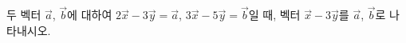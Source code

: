 두 벡터 $\vec{a}$, $\vec{b}$에 대하여 $2\vec{x}-3\vec{y}=\vec{a}$, $3\vec{x}-5\vec{y}=\vec{b}$일 때, 벡터 $\vec{x}-3\vec{y}$를 $\vec{a}$, $\vec{b}$로 나타내시오.
